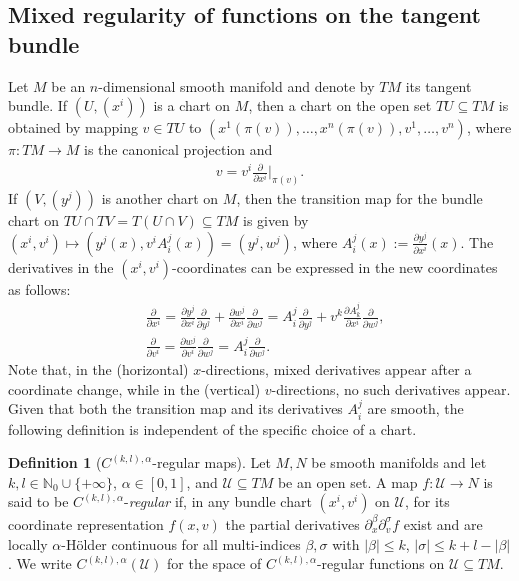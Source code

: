 \documentclass[a4paper,11pt]{article}
\numberwithin{equation}{section}
\theoremstyle{definition}
\newtheorem{Definition}{Definition}[section]
\theoremstyle{plain}
\begin{document}
\subsection{Mixed regularity of functions on the tangent bundle}%
\label{subsection: mixed regularity of maps}

Let $M$ be an $n$-dimensional smooth manifold and denote by $TM$ its tangent bundle.
If $(U,(x^i))$ is a chart on $M$, then a chart on the open set $TU \subseteq TM$ is obtained by mapping $v \in TU$ to $(x^1(\pi(v)),\ldots,x^n(\pi(v)), v^1,\ldots,v^n)$, where $\pi:TM \to M$ is the canonical projection and
\begin{align*}
    v = v^i \frac{\partial}{\partial x^i}\bigg|_{\pi(v)}.
\end{align*}
If $(V,(y^j))$ is another chart on $M$, then the transition map for the bundle chart on $TU \cap TV = T(U \cap V) \subseteq TM$ is given by $(x^i,v^i) \mapsto (y^j(x),v^i A^{j}_i(x)) = (y^j,w^j)$, where $A^j_i(x) := \frac{\partial y^j}{\partial x^i}(x)$.
The derivatives in the $(x^i,v^i)$-coordinates can be expressed in the new coordinates as follows:
\begin{align*}
    &\frac{\partial}{\partial x^i} 
    = \frac{\partial y^j}{\partial x^i}\frac{\partial}{\partial y^j} 
    + \frac{\partial w^j}{\partial x^i} \frac{\partial}{\partial w^j} 
    = A^j_i \frac{\partial}{\partial y^j} 
    + v^k \frac{\partial A^j_k}{\partial x^i} \frac{\partial}{\partial w^j},\\
    &\frac{\partial}{\partial v^i} 
    = \frac{\partial w^j}{\partial v^i} \frac{\partial}{\partial w^j} 
    = A^j_i \frac{\partial}{\partial w^j}.
\end{align*}
Note that, in the (horizontal) $x$-directions, mixed derivatives appear after a coordinate change, while in the (vertical) $v$-directions, no such derivatives appear. 
Given that both the transition map and its derivatives $A^j_i$ are smooth, the following definition is independent of the specific choice of a chart.

\begin{Definition}[$C^{(k,l),\alpha}$-regular maps]
    Let $M, N$ be smooth manifolds and let $k,l \in \mathbb{N}_0 \cup \{+\infty\}$, $\alpha \in [0,1]$, and $\mathcal{U} \subseteq TM$ be an open set.
    A map $f: \mathcal{U} \to N$ is said to be $C^{(k,l),\alpha}$-\emph{regular} if, in any bundle chart $(x^i,v^i)$ on $\mathcal{U}$, for its coordinate representation $f(x,v)$ the partial derivatives $\partial_x^{\beta} \partial_v^{\sigma} f$ exist and are
    locally $\alpha$-H\"older continuous 
    for all multi-indices $\beta,\sigma$ with $|\beta|\leq k$, $|\sigma| \leq k + l - |\beta|$.
    We write $C^{(k,l),\alpha}(\mathcal{U})$ for the space of $C^{(k,l),\alpha}$-regular functions on $\mathcal{U} \subseteq TM$. 
\end{Definition}
\end{document}

